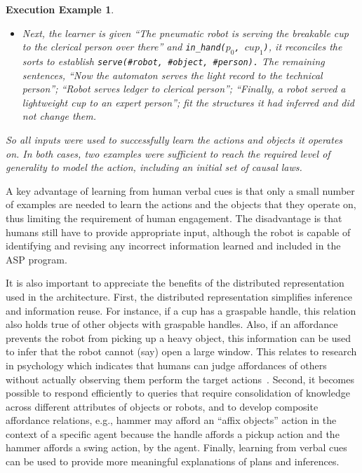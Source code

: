 \documentclass{article}
\newcommand{\stt}[1]{{\small\texttt{#1}}}
\newtheorem{execexample}{\bf Execution Example}
\begin{document}
\begin{execexample}
{\begin{itemize}
    \item Next, the learner is given ``The pneumatic robot is serving
      the breakable cup to the clerical person over there'' and
      \stt{in\_hand($p_0$, $cup_1$)}, it reconciles the sorts to
      establish \stt{serve(\#robot, \#object, \#person).} The
      remaining sentences, ``Now the automaton serves the light record
      to the technical person''; ``Robot serves ledger to clerical
      person''; ``Finally, a robot served a lightweight cup to an
      expert person''; fit the structures it had inferred and did not
      change them.
    \end{itemize}
    So all inputs were used to successfully learn the actions and
    objects it operates on. In both cases, two examples were
    sufficient to reach the required level of generality to model the
    action, including an initial set of causal laws.  }
\end{execexample}
\noindent
A key advantage of learning from human verbal cues is that only a
small number of examples are needed to learn the actions and the
objects that they operate on, thus limiting the requirement of human
engagement. The disadvantage is that humans still have to provide
appropriate input, although the robot is capable of identifying and
revising any incorrect information learned and included in the ASP
program.

It is also important to appreciate the benefits of the distributed
representation used in the architecture. First, the distributed
representation simplifies inference and information reuse. For
instance, if a cup has a graspable handle, this relation also holds
true of other objects with graspable handles. Also, if an affordance
prevents the robot from picking up a heavy object, this information
can be used to infer that the robot cannot (say) open a large window.
This relates to research in psychology which indicates that humans can
judge affordances of others without actually observing them perform
the target actions~\cite{ramenzoni:APP10}. Second, it becomes possible
to respond efficiently to queries that require consolidation of
knowledge across different attributes of objects or robots, and to
develop composite affordance relations, e.g., hammer may afford an
``affix objects'' action in the context of a specific agent because
the handle affords a pickup action and the hammer affords a swing
action, by the agent. Finally, learning from verbal cues can be used
to provide more meaningful explanations of plans and inferences.
\end{document}
